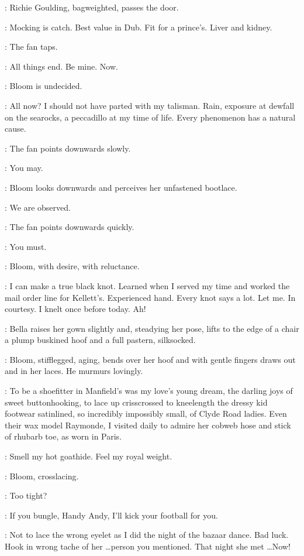 :
Richie Goulding, bagweighted, passes the door.

\Richie:
Mocking is catch.
Best value in Dub.
Fit for a prince's.
Liver and kidney.

:
The fan taps.

\Fan:
All things end.
Be mine.
Now.

:
Bloom is undecided.

\Bloom:
All now?
I should not have parted with my talisman.
Rain, exposure at dewfall on the searocks, a peccadillo at my time of life.
Every phenomenon has a natural cause.

:
The fan points downwards slowly.

\Fan:
You may.

:
Bloom looks downwards and perceives her unfastened bootlace.

\Bloom:
We are observed.

:
The fan points downwards quickly.

\Fan:
You must.

:
Bloom, with desire, with reluctance.

\Bloom:
I can make a true black knot.
Learned when I served my time and worked the mail order line for Kellett's.
Experienced hand.
Every knot says a lot.
Let me.
In courtesy.
I knelt once before today.
Ah!

:
Bella raises her gown slightly and, steadying her pose,
lifts to the edge of a chair a plump buskined hoof
and a full pastern, silksocked.

:
Bloom, stifflegged, aging, bends over her hoof
and with gentle fingers draws out and in her laces.
He murmurs lovingly.

\Bloom:
To be a shoefitter in Manfield's was my love's young dream,
the darling joys of sweet buttonhooking,
to lace up crisscrossed to kneelength the dressy kid footwear satinlined,
so incredibly impossibly small, of Clyde Road ladies.
Even their wax model Raymonde, I visited daily
to admire her cobweb hose and stick of rhubarb toe, as worn in Paris.

\Hoof[2]:
Smell my hot goathide.
Feel my royal weight.

:
Bloom, crosslacing.

\Bloom:
Too tight?

\Hoof:
If you bungle, Handy Andy, I'll kick your football for you.

\Bloom:
Not to lace the wrong eyelet as I did the night of the bazaar dance.
Bad luck.
Hook in wrong tache of her \ldots person you mentioned.
That night she met \ldots Now!

